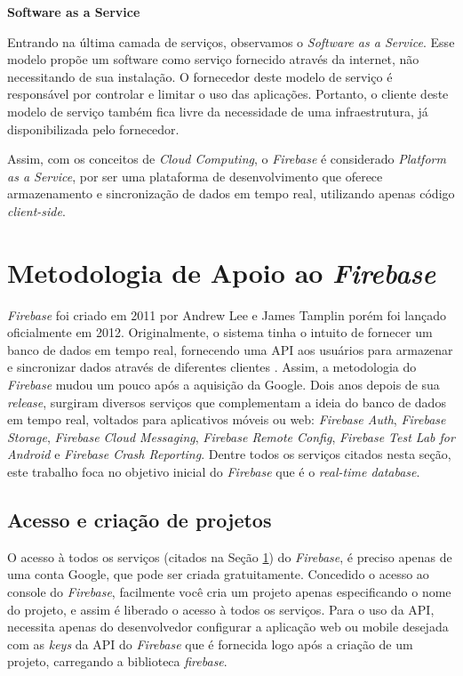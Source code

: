 \documentclass[12pt]{article}
\begin{document}
\textbf{Software as a Service}

Entrando na última camada de serviços, observamos o \textit{Software as a Service}. Esse modelo propõe um software como serviço fornecido através da internet, não necessitando de sua instalação. O fornecedor deste modelo de serviço é responsável por controlar e limitar o uso das aplicações. Portanto, o cliente deste modelo de serviço também fica livre da necessidade de uma infraestrutura, já disponibilizada pelo fornecedor.

Assim, com os conceitos de \textit{Cloud Computing}, o \textit{Firebase} é considerado \textit{Platform as a Service}, por ser uma plataforma de desenvolvimento que oferece armazenamento e sincronização de dados em tempo real, utilizando apenas código \textit{client-side}. 

\section{Metodologia de Apoio ao \textit{Firebase}}  \label{sec:metodologia}

\textit{Firebase} foi criado em 2011 por Andrew Lee e James Tamplin porém foi lançado oficialmente em 2012. Originalmente, o sistema tinha o intuito de fornecer um banco de dados em tempo real, fornecendo uma API aos usuários para armazenar e sincronizar dados através de diferentes clientes \cite{3}. Assim, a metodologia do \textit{Firebase} mudou um pouco após a aquisição da Google. Dois anos depois de sua \textit{release}, surgiram diversos serviços que complementam a ideia do banco de dados em tempo real, voltados para aplicativos móveis ou web: \textit{Firebase Auth}, \textit{Firebase Storage}, \textit{Firebase Cloud Messaging}, \textit{Firebase Remote Config}, \textit{Firebase Test Lab for Android} e \textit{Firebase Crash Reporting}. Dentre todos os serviços citados nesta seção, este trabalho foca no objetivo inicial do \textit{Firebase} que é o \textit{real-time database}.

\subsection{Acesso e criação de projetos}

O acesso à todos os serviços (citados na Seção \ref{sec:metodologia}) do \textit{Firebase}, é preciso apenas de uma conta Google, que pode ser criada gratuitamente. Concedido o acesso ao console do \textit{Firebase}, facilmente você cria um projeto apenas especificando o nome do projeto, e assim é liberado o acesso à todos os serviços. Para o uso da API, necessita apenas do desenvolvedor configurar a aplicação web ou mobile desejada com as \textit{keys} da API do \textit{Firebase} que é fornecida logo após a criação de um projeto, carregando a biblioteca \textit{firebase}.
\end{document}
